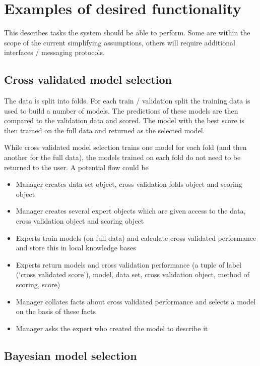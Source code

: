\documentclass[twoside,11pt]{article}
\begin{document}
\section{Examples of desired functionality}

This describes tasks the system should be able to perform.
Some are within the scope of the current simplifying assumptions, others will require additional interfaces / messaging protocols.

\subsection{Cross validated model selection}

The data is split into folds.
For each train / validation split the training data is used to build a number of models.
The predictions of these models are then compared to the validation data and scored.
The model with the best score is then trained on the full data and returned as the selected model.

While cross validated model selection trains one model for each fold (and then another for the full data), the models trained on each fold do not need to be returned to the user.
A potential flow could be
\begin{itemize}
  \item Manager creates data set object, cross validation folds object and scoring object
  \item Manager creates several expert objects which are given access to the data, cross validation object and scoring object
  \item Experts train models (on full data) and calculate cross validated performance and store this in local knowledge bases
  \item Experts return models and cross validation performance (a tuple of label (\eg `cross validated score'), model, data set, cross validation object, method of scoring, score)
  \item Manager collates facts about cross validated performance and selects a model on the basis of these facts
  \item Manager asks the expert who created the model to describe it
\end{itemize}

\subsection{Bayesian model selection}
\end{document}
